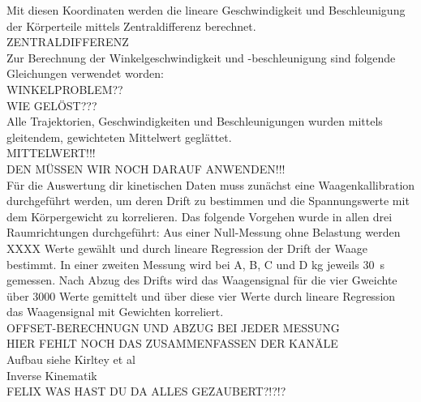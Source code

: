 Mit diesen Koordinaten werden die lineare Geschwindigkeit und Beschleunigung der Körperteile mittels Zentraldifferenz berechnet.\\
ZENTRALDIFFERENZ\\

Zur Berechnung der Winkelgeschwindigkeit und -beschleunigung sind folgende Gleichungen verwendet worden:\\
WINKELPROBLEM??\\
WIE GELÖST???\\

Alle Trajektorien, Geschwindigkeiten und Beschleunigungen wurden mittels gleitendem, gewichteten Mittelwert geglättet.\\
MITTELWERT!!!\\
DEN MÜSSEN WIR NOCH DARAUF ANWENDEN!!!\\
Für die Auswertung dir kinetischen Daten muss zunächst eine Waagenkallibration durchgeführt werden, um deren Drift zu bestimmen und die Spannungswerte mit dem Körpergewicht zu korrelieren. Das folgende Vorgehen wurde in allen drei Raumrichtungen durchgeführt: Aus einer Null-Messung ohne Belastung werden XXXX Werte gewählt und durch lineare Regression der Drift der Waage bestimmt. In einer zweiten Messung wird bei A, B, C und D kg jeweils 30~s gemessen. Nach Abzug des Drifts wird das Waagensignal für die vier Gweichte über 3000 Werte gemittelt und über diese vier Werte durch lineare Regression das Waagensignal mit Gewichten korreliert.\\
OFFSET-BERECHNUGN UND ABZUG BEI JEDER MESSUNG\\
HIER FEHLT NOCH DAS ZUSAMMENFASSEN DER KANÄLE\\


Aufbau siehe Kirltey et al\\
Inverse Kinematik\\
FELIX WAS HAST DU DA ALLES GEZAUBERT?!?!?

